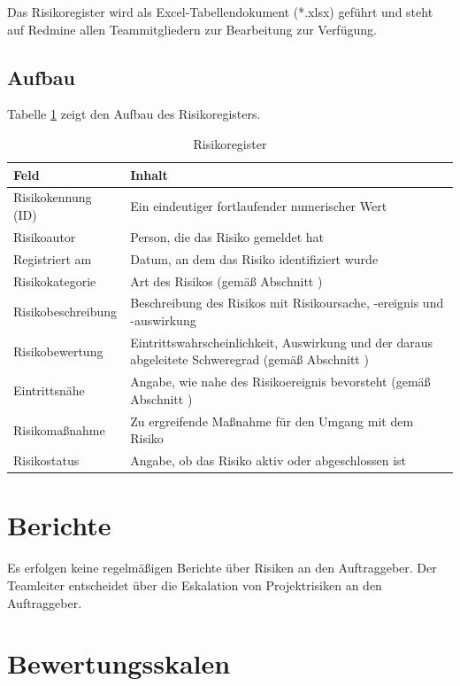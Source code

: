 \documentclass[a4paper,11pt,listof=numbered,glossary=totoc,parskip=half,toc=bib]{scrreprt}
\begin{document}
{Das Risikoregister wird als Excel-Tabellendokument (*.xlsx) geführt und steht auf Redmine allen Teammitgliedern zur Bearbeitung zur Verfügung.

\subsection{Aufbau}


Tabelle \ref{tab:risikoregister} zeigt den Aufbau des Risikoregisters.

\begin{table}
\begin{tabularx}{\textwidth}{lX}
	\toprule
	Feld & Inhalt \\
	\midrule
	Risikokennung (ID) & Ein eindeutiger fortlaufender numerischer Wert \\
	 Risikoautor& Person, die das Risiko gemeldet hat \\
	 Registriert am& Datum, an dem das Risiko identifiziert wurde\\
	 Risikokategorie& Art des Risikos (gemäß Abschnitt \nameref{subsec:risikokategorien})\\
	 Risikobeschreibung& Beschreibung des Risikos mit Risikoursache, -ereignis und -auswirkung\\
	 Risikobewertung& Eintrittswahrscheinlichkeit, Auswirkung und der daraus abgeleitete Schweregrad (gemäß Abschnitt \nameref{subsec:bewertungsskalen})\\
	 Eintrittsnähe& Angabe, wie nahe des Risikoereignis bevorsteht (gemäß Abschnitt \nameref{subsec:eintrittsnaehe})\\
	 Risikomaßnahme& Zu ergreifende Maßnahme für den Umgang mit dem Risiko\\
	 Risikostatus& Angabe, ob das Risiko aktiv oder abgeschlossen ist\\
	 \bottomrule
	 
\end{tabularx}
\caption{Risikoregister}
\label{tab:risikoregister}
\end{table}
	
\section{Berichte}

Es erfolgen keine regelmäßigen Berichte über Risiken an den Auftraggeber. Der Teamleiter entscheidet über die Eskalation von Projektrisiken an den Auftraggeber.

\section{Bewertungsskalen}
\label{subsec:bewertungsskalen}

}
\end{document}
